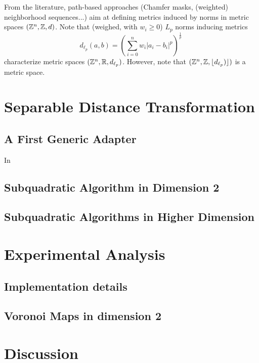 \documentclass{llncs}
\begin{document}
From the literature, path-based approaches (Chamfer masks, (weighted)
neighborhood sequences...)  aim at defining metrics induced by norms
in metric spaces $({\mathbb{Z}}^n, {\mathbb{Z}} , d)$.  Note that (weighed, with $w_i\geq 0$) $L_p$ norms inducing
metrics
\begin{equation}
    d_{\ell_p} (a,b) = \left ( \sum_{i=0}^n w_i|a_i-b_i |^p \right )^{\frac{1}{p}}\,
  \end{equation}
characterize metric spaces $({\mathbb{Z}}^n, {\mathbb{R}} , d_{\ell_p})$. However,  note that
$({\mathbb{Z}}^n,{\mathbb{Z}}, \lfloor d_{\ell_p}) \rfloor)$ is a metric space.


\section{Separable Distance Transformation}
\label{sec:separ-dist-transf}

\subsection{A First Generic Adapter}
\label{sec:first-gener-adapt}

In

\subsection{Subquadratic Algorithm in Dimension 2}
\label{sec:subq-algor-dimens}


\subsection{Subquadratic Algorithms in Higher Dimension}
\label{sec:subq-algor-high}


\section{Experimental Analysis}
\label{sec:exper-analys}

\subsection{Implementation details}
\label{sec:impl-deta}


\subsection{Voronoi Maps in dimension 2}
\label{sec:impl-2D}



\section{Discussion}
\label{sec:discussion}





\end{document}
